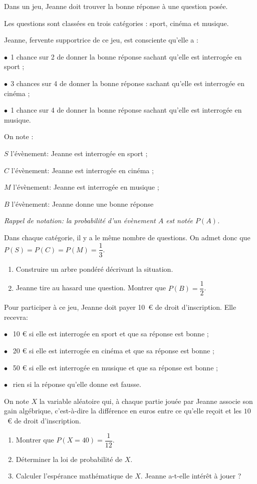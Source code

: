 \medskip

Dans un jeu, Jeanne doit trouver la bonne réponse à une question posée.

Les questions sont classées en trois catégories : sport, cinéma et musique.

Jeanne, fervente supportrice de ce jeu, est consciente qu'elle a :

$\bullet~~$1 chance sur 2 de donner la bonne réponse sachant qu'elle est interrogée en sport ;

$\bullet~~$3 chances sur 4 de donner la bonne réponse sachant qu'elle est interrogée en cinéma ;
 
$\bullet~~$1 chance sur 4 de donner la bonne réponse sachant qu'elle est interrogée en musique.

On note :

\quad $S$ l'évènement: \og Jeanne est interrogée en sport\fg{} ;

\quad $C$ l'évènement: \og Jeanne est interrogée en cinéma\fg{} ; 

\quad $M$ l'évènement: \og Jeanne est interrogée en musique\fg{} ; 

\quad $B$ l'évènement: \og Jeanne donne une bonne réponse \fg


\emph{Rappel de notation: la probabilité d'un évènement $A$ est notée $P(A)$.}

Dans chaque catégorie, il y a le même nombre de questions. On admet donc que
$P(S) = P(C) = P(M) = \dfrac{1}{3}$.

\begin{enumerate}
\item Construire un arbre pondéré décrivant la situation.
\item Jeanne tire au hasard une question. Montrer que $P(B) = \dfrac{1}{2}$.
\end{enumerate}

Pour participer à ce jeu, Jeanne doit payer 10~\euro{} de droit d'inscription. Elle recevra:

$\bullet~~$ 10 \euro{} si elle est interrogée en sport et que sa réponse est bonne ;

$\bullet~~$ 20 \euro{} si elle est interrogée en cinéma et que sa réponse est bonne ;

$\bullet~~$ 50 \euro{} si elle est interrogée en musique et que sa réponse est bonne ;

$\bullet~~$ rien si la réponse qu'elle donne est fausse.

On note $X$ la variable aléatoire qui, à chaque partie jouée par Jeanne associe son gain algébrique, c'est-à-dire la différence en euros entre ce qu'elle reçoit et les $10$~\euro{} de droit d'inscription.

\begin{enumerate}[resume]
\item Montrer que $P(X = 40) = \dfrac{1}{12}$.
\item Déterminer la loi de probabilité de $X$.
\item Calculer l'espérance mathématique de $X$. Jeanne a-t-elle intérêt à jouer ?
\end{enumerate}
